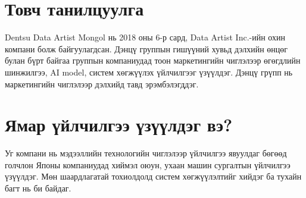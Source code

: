 \section{Товч танилцуулга}
\quad \quad	Dentsu Data Artist Mongol нь 2018 оны 6-р сард, Data Artist Inc.-ийн охин компани болж байгуулагдсан. Дэнцү группын гишүүний хувьд дэлхийн өнцөг булан бүрт байгаа группын компаниудад тоон маркетингийн чиглэлээр өгөгдлийн шинжилгээ, AI model, систем хөгжүүлэх үйлчилгээг үзүүлдэг. Дэнцү грүпп нь маркетингийн чиглэлээр дэлхийд тавд эрэмбэлэгддэг.

\section{Ямар үйлчилгээ үзүүлдэг вэ?}
\quad \quad	Уг компани нь мэдээллийн технологийн чиглэлээр үйлчилгээ явуулдаг бөгөөд голчлон Японы компаниудад хиймэл оюун, ухаан машин сургалтын үйлчилгээ үзүүлдэг. Мөн шаардлагатай тохиолдолд систем хөгжүүлэлтийг хийдэг ба тухайн багт нь би байдаг.


